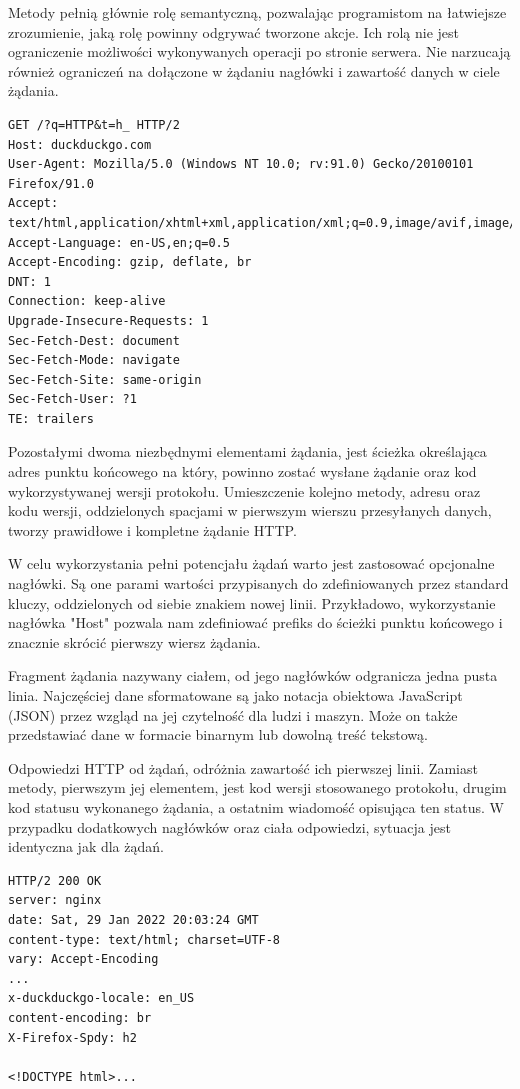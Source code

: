 Metody pełnią głównie rolę semantyczną, pozwalając programistom na łatwiejsze zrozumienie, jaką rolę powinny odgrywać tworzone akcje. Ich rolą nie jest ograniczenie możliwości wykonywanych operacji po stronie serwera.  Nie narzucają również ograniczeń na dołączone w żądaniu nagłówki i zawartość danych w ciele żądania.

\begin{lstlisting}[caption=Przykładowe rządanie HTTP, label=lst:http.example_request]
GET /?q=HTTP&t=h_ HTTP/2
Host: duckduckgo.com
User-Agent: Mozilla/5.0 (Windows NT 10.0; rv:91.0) Gecko/20100101 Firefox/91.0
Accept: text/html,application/xhtml+xml,application/xml;q=0.9,image/avif,image/webp,*/*;q=0.8
Accept-Language: en-US,en;q=0.5
Accept-Encoding: gzip, deflate, br
DNT: 1
Connection: keep-alive
Upgrade-Insecure-Requests: 1
Sec-Fetch-Dest: document
Sec-Fetch-Mode: navigate
Sec-Fetch-Site: same-origin
Sec-Fetch-User: ?1
TE: trailers
\end{lstlisting}

Pozostałymi dwoma niezbędnymi elementami żądania, jest ścieżka określająca adres punktu końcowego na który, powinno zostać wysłane żądanie oraz kod wykorzystywanej wersji protokołu. Umieszczenie kolejno metody, adresu oraz kodu wersji, oddzielonych spacjami w pierwszym wierszu przesyłanych danych, tworzy prawidłowe i kompletne żądanie HTTP. 

W celu wykorzystania pełni potencjału żądań warto jest zastosować opcjonalne nagłówki. Są one parami wartości przypisanych do zdefiniowanych przez standard kluczy, oddzielonych od siebie znakiem nowej linii. Przykładowo, wykorzystanie nagłówka "Host" pozwala nam zdefiniować prefiks do ścieżki punktu końcowego i znacznie skrócić pierwszy wiersz żądania.

Fragment żądania nazywany ciałem, od jego nagłówków odgranicza jedna pusta linia. Najczęściej dane sformatowane są jako notacja obiektowa JavaScript (JSON) przez wzgląd na jej czytelność dla ludzi i maszyn. Może on także przedstawiać dane w formacie binarnym lub dowolną treść tekstową.

Odpowiedzi HTTP od żądań, odróżnia zawartość ich pierwszej linii. Zamiast metody, pierwszym jej elementem, jest kod wersji stosowanego protokołu, drugim kod statusu wykonanego żądania, a ostatnim wiadomość opisująca ten status. W przypadku dodatkowych nagłówków oraz ciała odpowiedzi, sytuacja jest identyczna jak dla żądań.

\begin{lstlisting}[caption=Odpowiedź HTTP na przykładowe żądanie z listingu \ref{lst:http.example_request}, label=lst:http.example_response]
HTTP/2 200 OK
server: nginx
date: Sat, 29 Jan 2022 20:03:24 GMT
content-type: text/html; charset=UTF-8
vary: Accept-Encoding
...
x-duckduckgo-locale: en_US
content-encoding: br
X-Firefox-Spdy: h2

<!DOCTYPE html>...
\end{lstlisting}

